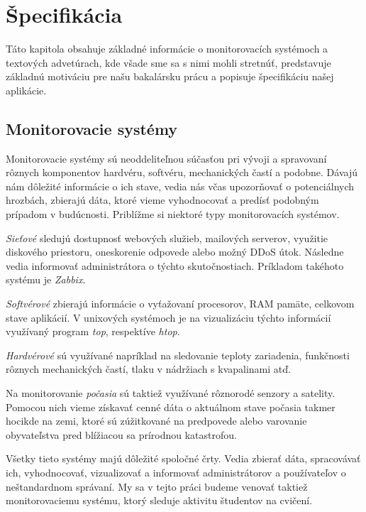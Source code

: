 \chapter{Špecifikácia}
\label{kap:specifikacia}

Táto kapitola obsahuje základné informácie o monitorovacích systémoch a textových advetúrach, kde všade sme sa s nimi mohli stretnúť, predstavuje základnú motiváciu pre našu bakalársku prácu a popisuje špecifikáciu našej aplikácie.

\section{Monitorovacie systémy}
\label{sec:monitorsystems}

Monitorovacie systémy sú neoddeliteľnou súčasťou pri vývoji a spravovaní rôznych
komponentov hardvéru, softvéru, mechanických častí a podobne. Dávajú nám dôležité
informácie o ich stave, vedia nás včas upozorňovať o potenciálnych hrozbách,
zbierajú dáta, ktoré vieme vyhodnocovať a predísť podobným prípadom v budúcnosti.
Priblížme si niektoré typy monitorovacích systémov.

\textit{Sieťové} sledujú dostupnosť webových služieb, mailových serverov, využitie
diskového priestoru, oneskorenie odpovede alebo možný DDoS útok. Následne vedia informovať administrátora o týchto skutočnostiach. Príkladom takéhoto systému je \textit{Zabbix}.
~\cite{bib:networkmonitoring}

\textit{Softvérové} zbierajú informácie o vyťažovaní procesorov, RAM pamäte, celkovom
stave aplikácií. V unixových systémoch je na vizualizáciu týchto informácií využívaný
program \textit{top}, respektíve \textit{htop}.

\textit{Hardvérové} sú využívané napríklad na sledovanie teploty zariadenia, funkčnosti rôznych mechanických častí, tlaku v nádržiach s kvapalinami atď. 

Na monitorovanie \textit{počasia} sú taktiež využívané rôznorodé senzory a satelity.
Pomocou nich vieme získavať cenné dáta o aktuálnom stave počasia takmer hocikde
na zemi, ktoré sú zúžitkované na predpovede alebo varovanie obyvateľstva pred
blížiacou sa prírodnou katastrofou.

Všetky tieto systémy majú dôležité spoločné črty. Vedia zbierať dáta, spracovávať ich,
vyhodnocovať, vizualizovať a informovať administrátorov a používateľov o neštandardnom
správaní. My sa v tejto práci budeme venovať taktiež monitorovaciemu systému, ktorý sleduje aktivitu študentov na cvičení.

